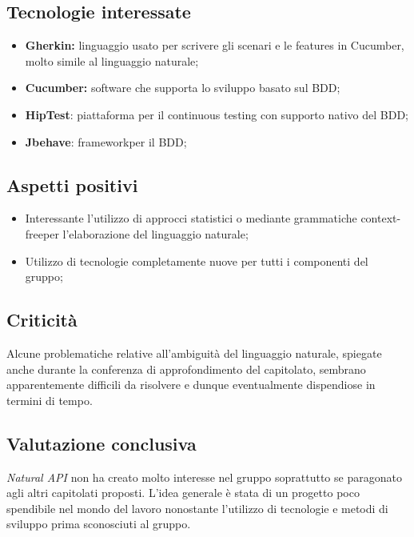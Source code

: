 \subsection{Tecnologie interessate}
\begin{itemize}
	\item \textbf{Gherkin:} linguaggio usato per scrivere gli scenari e le features in Cucumber, molto simile al linguaggio naturale; 
	\item \textbf{Cucumber:} software che supporta lo sviluppo basato sul BDD\glos;
	\item \textbf{HipTest}: piattaforma per il continuous testing con supporto nativo del BDD\glos;
	\item \textbf{Jbehave}: framework\glo per il BDD\glos;
\end{itemize}

\subsection{Aspetti positivi}

\begin{itemize}
	\item Interessante l'utilizzo di approcci statistici o mediante grammatiche context-free\glo per l'elaborazione del linguaggio naturale;
	\item Utilizzo di tecnologie completamente nuove per tutti i componenti del gruppo;
\end{itemize}


\subsection{Criticità}
Alcune problematiche relative all'ambiguità del linguaggio naturale, spiegate anche durante la conferenza di approfondimento del capitolato\glo, sembrano apparentemente difficili da risolvere e dunque eventualmente dispendiose in termini di tempo.


\subsection{Valutazione conclusiva}
\textit{Natural API} non ha creato molto interesse nel gruppo soprattutto se paragonato agli altri capitolati proposti. L'idea generale è stata di un progetto poco spendibile nel mondo del lavoro nonostante l'utilizzo di tecnologie e metodi di sviluppo prima sconosciuti al gruppo.
